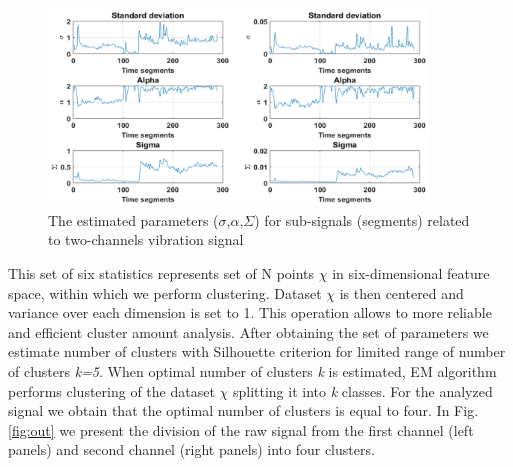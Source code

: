 \documentclass[10pt]{article}
\begin{document}
\begin{figure}[h!]
\centering
\includegraphics[width=0.9\textwidth]{wykresy/stats}
\caption{The estimated parameters ($\sigma$,$\alpha$,$\Sigma$) for sub-signals (segments) related to two-channels vibration signal}
\label{fig:stats}
\end{figure}

This set of six statistics represents set of N points $\chi$ in six-dimensional feature space, within which we perform clustering. Dataset $\chi$ is then centered and variance over each dimension is set to 1. This operation allows to more reliable and efficient cluster amount analysis.
After obtaining the set of parameters we estimate number of clusters with Silhouette criterion for limited range of number of clusters \textit{k=5}. When optimal number of clusters \textit{k} is estimated, EM algorithm performs clustering of the dataset $\chi$ splitting it into \textit{k} classes. For the analyzed signal we obtain that the optimal number of clusters is equal to four. In Fig. \ref{fig:out} we present the division of the raw signal from the first channel (left panels) and second channel (right panels) into four clusters.
\end{document}
